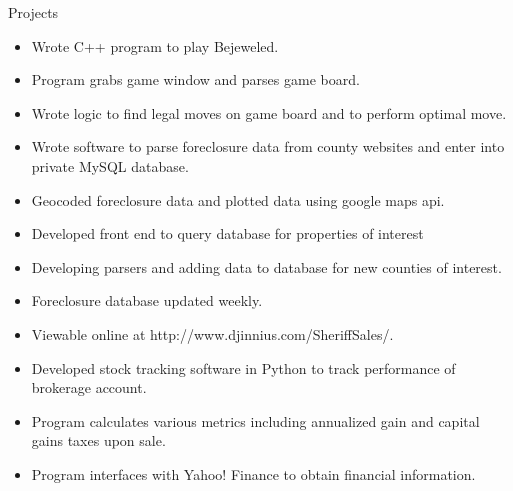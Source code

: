 \begin{category}{Projects}





\begin{itemize}
\item Wrote C++ program to play Bejeweled.
\item Program grabs game window and parses game board.
\item Wrote logic to find legal moves on game board and to perform optimal move.
\end{itemize}

\begin{itemize}
\item Wrote software to parse foreclosure data from county websites and enter into private MySQL database.
\item Geocoded foreclosure data and plotted data using google maps api.
\item Developed front end to query database for properties of interest
\item Developing parsers and adding data to database for new counties of interest.
\item Foreclosure database updated weekly.
\item Viewable online at http://www.djinnius.com/SheriffSales/.
\end{itemize}

\begin{itemize}
\item Developed stock tracking software in Python to track performance of brokerage account.
\item Program calculates various metrics including annualized gain and capital gains taxes upon sale.
\item Program interfaces with Yahoo! Finance to obtain financial information.
\end{itemize}


\end{category}
